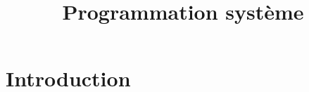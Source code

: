 
\usepackage{myInfolines}
\usepackage{longtable,array}
\title{Programmation système}




	\begin{frame}
		\titlepage
	\end{frame}
	
	\section*{Introduction}
	
		\begin{frame}

		\end{frame}
	
		\begin{frame}
			\tableofcontents
		\end{frame}
		

